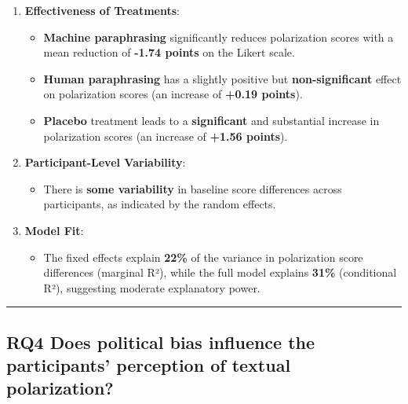 \documentclass[
]{article}
\providecommand{\tightlist}{%
  \setlength{\itemsep}{0pt}\setlength{\parskip}{0pt}}
\begin{document}
\begin{enumerate}
\def\labelenumi{\arabic{enumi}.}
\tightlist
\item
  \textbf{Effectiveness of Treatments}:

  \begin{itemize}
  \tightlist
  \item
    \textbf{Machine paraphrasing} significantly reduces polarization
    scores with a mean reduction of \textbf{-1.74 points} on the Likert
    scale.
  \item
    \textbf{Human paraphrasing} has a slightly positive but
    \textbf{non-significant} effect on polarization scores (an increase
    of \textbf{+0.19 points}).
  \item
    \textbf{Placebo} treatment leads to a \textbf{significant} and
    substantial increase in polarization scores (an increase of
    \textbf{+1.56 points}).
  \end{itemize}
\item
  \textbf{Participant-Level Variability}:

  \begin{itemize}
  \tightlist
  \item
    There is \textbf{some variability} in baseline score differences
    across participants, as indicated by the random effects.
  \end{itemize}
\item
  \textbf{Model Fit}:

  \begin{itemize}
  \tightlist
  \item
    The fixed effects explain \textbf{22\%} of the variance in
    polarization score differences (marginal R²), while the full model
    explains \textbf{31\%} (conditional R²), suggesting moderate
    explanatory power.
  \end{itemize}
\end{enumerate}

\begin{center}\rule{0.5\linewidth}{0.5pt}\end{center}

\subsection{\texorpdfstring{\textbf{RQ4} Does political bias influence
the participants' perception of textual
polarization?}{RQ4 Does political bias influence the participants' perception of textual polarization?}}\label{rq4-does-political-bias-influence-the-participants-perception-of-textual-polarization}
\end{document}
